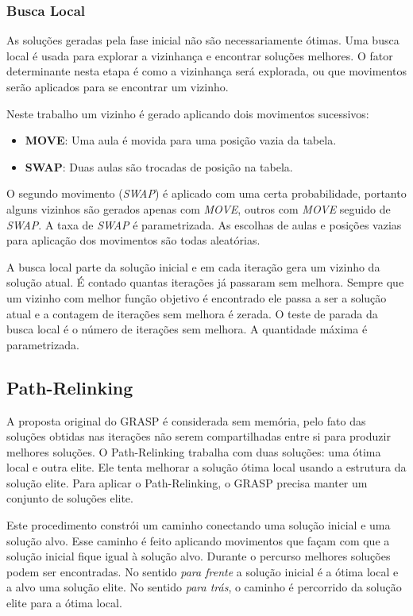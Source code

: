 \documentclass[11pt]{article}
\begin{document}
\subsubsection{Busca Local}

As soluções geradas pela fase inicial não são necessariamente ótimas. Uma busca local é usada para explorar a vizinhança e encontrar soluções melhores. O fator determinante nesta etapa é como a vizinhança será explorada, ou que movimentos serão aplicados para se encontrar um vizinho.

Neste trabalho um vizinho é gerado aplicando dois movimentos sucessivos:

\begin{itemize}
\item \textbf{MOVE}: Uma aula é movida para uma posição vazia da tabela.
\item \textbf{SWAP}: Duas aulas são trocadas de posição na tabela.
\end{itemize}

O segundo movimento (\textit{SWAP}) é aplicado com uma certa probabilidade, portanto alguns vizinhos são gerados apenas com \textit{MOVE}, outros com \textit{MOVE} seguido de \textit{SWAP}. A taxa de \textit{SWAP} é parametrizada. As escolhas de aulas e posições vazias para aplicação dos movimentos são todas aleatórias.

A busca local parte da solução inicial e em cada iteração gera um vizinho da solução atual. É contado quantas iterações já passaram sem melhora. Sempre que um vizinho com melhor função objetivo é encontrado ele passa a ser a solução atual e a contagem de iterações sem melhora é zerada. O teste de parada da busca local é o número de iterações sem melhora. A quantidade máxima é parametrizada. 

\subsection{Path-Relinking}

A proposta original do GRASP é considerada sem memória, pelo fato das soluções obtidas nas iterações não serem compartilhadas entre si para produzir melhores soluções. O Path-Relinking trabalha com duas soluções: uma ótima local e outra elite. Ele tenta melhorar a solução ótima local usando a estrutura da solução elite. Para aplicar o Path-Relinking, o GRASP precisa manter um conjunto de soluções elite.

Este procedimento constrói um caminho conectando uma solução inicial e uma solução alvo. Esse caminho é feito aplicando movimentos que façam com que a solução inicial fique igual à solução alvo. Durante o percurso melhores soluções podem ser encontradas. No sentido \textit{para frente} a solução inicial é a ótima local e a alvo uma solução elite. No sentido \textit{para trás}, o caminho é percorrido da solução elite para a ótima local.
\end{document}
